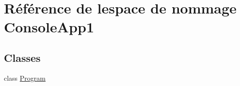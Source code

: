 \hypertarget{namespace_console_app1}{}\section{Référence de l\textquotesingle{}espace de nommage Console\+App1}
\label{namespace_console_app1}
\subsection*{Classes}
\begin{DoxyCompactItemize}
\item 
class \mbox{\hyperlink{class_console_app1_1_1_program}{Program}}
\end{DoxyCompactItemize}

